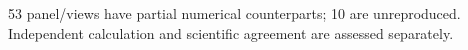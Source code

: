 53 panel/views have partial numerical counterparts; 10 are unreproduced. Independent calculation and scientific agreement are assessed separately.
